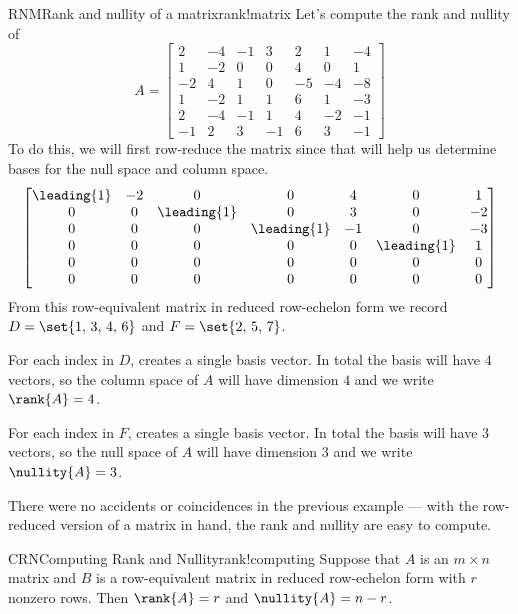 \begin{example}{RNM}{Rank and nullity of a matrix}{rank!matrix}
Let's compute the rank and nullity of
%
\begin{equation*}
A=\begin{bmatrix}
2 & -4 & -1 & 3 & 2 & 1 & -4\\
1 & -2 & 0 & 0 & 4 & 0 & 1\\
-2 & 4 & 1 & 0 & -5 & -4 & -8\\
1 & -2 & 1 & 1 & 6 & 1 & -3\\
2 & -4 & -1 & 1 & 4 & -2 & -1\\
-1 & 2 & 3 & -1 & 6 & 3 & -1
\end{bmatrix}
\end{equation*}
%
To do this, we will first row-reduce the matrix since that will help us determine bases for the null space and column space.
%
\begin{equation*}
\begin{bmatrix}
\leading{1} & -2 & 0 & 0 & 4 & 0 & 1\\
0 & 0 & \leading{1} & 0 & 3 & 0 & -2\\
0 & 0 & 0 & \leading{1} & -1 & 0 & -3\\
0 & 0 & 0 & 0 & 0 & \leading{1} & 1\\
0 & 0 & 0 & 0 & 0 & 0 & 0\\
0 & 0 & 0 & 0 & 0 & 0 & 0
\end{bmatrix}
\end{equation*}
%
From this row-equivalent matrix in reduced row-echelon form we record $D=\set{1,\,3,\,4,\,6}$ and $F=\set{2,\,5,\,7}$.\par
%
For each index in $D$,  creates a single basis vector.  In total the basis will have $4$ vectors, so the column space of $A$ will have dimension $4$ and we write $\rank{A}=4$.\par
%
For each index in $F$,  creates a single basis vector.  In total the basis will have $3$ vectors, so the null space of $A$ will have dimension $3$ and we write $\nullity{A}=3$.
%
\end{example}
%
There were no accidents or coincidences in the previous example --- with the row-reduced version of a matrix in hand, the rank and nullity are easy to compute.
%
\begin{theorem}{CRN}{Computing Rank and Nullity}{rank!computing}
Suppose that $A$ is an $m\times n$ matrix and $B$ is a row-equivalent matrix in reduced row-echelon form with $r$ nonzero rows.  Then $\rank{A}=r$ and $\nullity{A}=n-r$.
\end{theorem}
